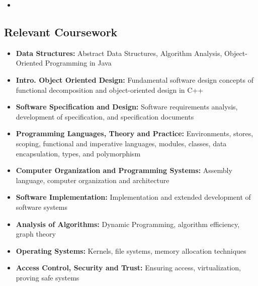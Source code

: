 \documentclass[11pt,a4paper,roman]{moderncv}        %
\begin{document}
\vspace{0pt}

\begin{itemize}

\item{}

\end{itemize}

\vspace{2pt}

\subsection{Relevant Coursework}

\vspace{1pt}

\begin{itemize}

  \item{\textbf{Data Structures:} Abstract Data Structures, Algorithm Analysis, Object-Oriented Programming in Java}
  \item{\textbf{Intro. Object Oriented Design:} Fundamental software design concepts of functional decomposition and object-oriented design in C++}
  \item{\textbf{Software Specification and Design:} Software requirements analysis, development of specification, and specification documents}
  \item{\textbf{Programming Languages, Theory and Practice:} Environments, stores, scoping, functional and imperative languages, modules, classes, data encapsulation, types, and polymorphism}
  \item{\textbf{Computer Organization and Programming Systems:} Assembly language, computer organization and architecture}
  \item{\textbf{Software Implementation:} Implementation and extended development of software systems}
  \item{\textbf{Analysis of Algorithms:} Dynamic Programming, algorithm efficiency, graph theory}
  \item{\textbf{Operating Systems:} Kernels, file systems, memory allocation techniques}
  \item{\textbf{Access Control, Security and Trust:} Ensuring access, virtualization, proving safe systems}

\end{itemize}
\end{document}
